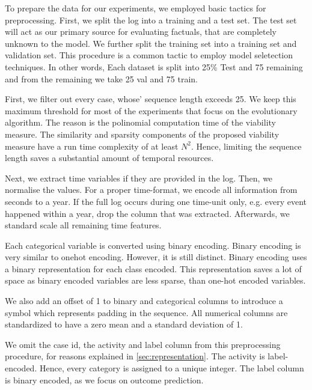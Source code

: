 \documentclass[./../../paper.tex]{subfiles}
\begin{document}
To prepare the data for our experiments, we employed basic tactics for preprocessing. First, we split the log into a training and a test set. The test set will act as our primary source for evaluating factuals, that are completely unknown to the model. We further split the training set into a training set and validation set. This procedure is a common tactic to employ model seletection techniques.  In other words, Each dataset is split into 25\% Test and 75 remaining and from the remaining we take 25 val and 75 train.

First, we filter out every case, whose' sequence length exceeds 25.  We keep this maximum threshold for most of the experiments that focus on the evolutionary algorithm. The reason is the polinomial computation time of the viability measure. The similarity and sparsity components of the proposed viability measure have a run time complexity of at least $N^2$. Hence, limiting the sequence length saves a substantial amount of temporal resources.

Next, we extract time variables if they are provided in the log. Then, we normalise the values. For a proper time-format, we encode all information from seconds to a year. If the full log occurs during one time-unit only, e.g. every event happened within a year, drop the column that was extracted.  Afterwards, we standard scale all remaining time features.

Each categorical variable is converted using binary encoding. Binary encoding is very similar to onehot encoding. However, it is still distinct. Binary encoding uses a binary representation for each class encoded. This representation saves a lot of space as binary encoded variables are less sparse, than one-hot encoded variables.


We also add an offset of 1 to binary and categorical columns to introduce a symbol which represents padding in the sequence. All numerical columns are standardized to have a zero mean and a standard deviation of 1.

We omit the case id, the activity and label column from this preprocessing procedure, for reasons explained in \autoref{sec:representation}. The activity is label-encoded. Hence, every category is assigned to a unique integer. The label column is binary encoded, as we focus on outcome prediction.


  
\end{document}
